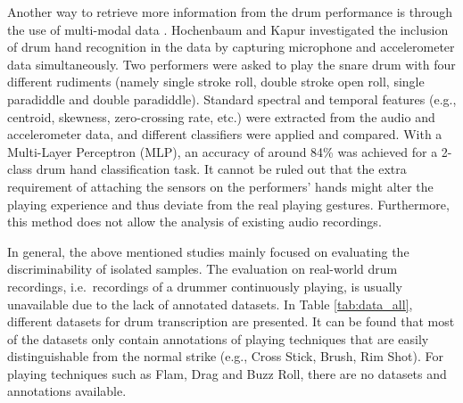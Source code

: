 \documentclass{article}
\begin{document}
Another way to retrieve more information from the drum performance is through the use of multi-modal data \cite{Hochenbaum2011}. Hochenbaum and Kapur investigated the inclusion of drum hand recognition in the data by capturing microphone and accelerometer data simultaneously. Two performers were asked to play the snare drum with four different rudiments (namely single stroke roll, double stroke open roll, single paradiddle and double paradiddle). Standard spectral and temporal features (e.g., centroid, skewness, zero-crossing rate, etc.) were extracted from the audio and accelerometer data, and different classifiers were applied and compared. With a Multi-Layer Perceptron (MLP), an accuracy of around 84\% was achieved for a 2-class drum hand classification task. It cannot be ruled out that the extra requirement of attaching the sensors on the performers' hands might alter the playing experience and thus deviate from the real playing gestures. Furthermore, this method does not allow the analysis of existing audio recordings. 

In general, the above mentioned studies mainly focused on evaluating the discriminability of isolated samples. The evaluation on real-world drum recordings, i.e.\ recordings of a drummer continuously playing, is usually unavailable due to the lack of annotated datasets. In Table \ref{tab:data_all}, different datasets for drum transcription are presented. It can be found that most of the datasets only contain annotations of playing techniques that are easily distinguishable from the normal strike (e.g., Cross Stick, Brush, Rim Shot). For playing techniques such as Flam, Drag and Buzz Roll, there are no datasets and annotations available. 


\end{document}
